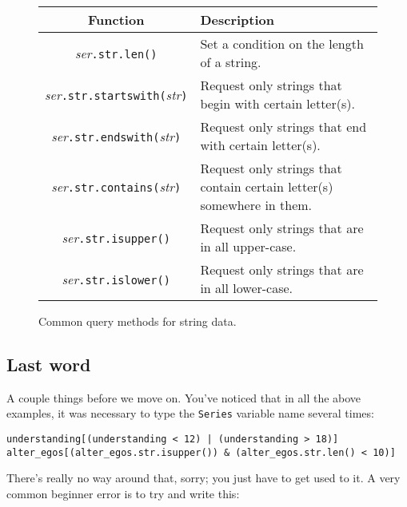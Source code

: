 \setlength\extrarowheight{5pt}

\begin{figure}[ht]
\centering
\begin{tabular}{c|p{3.3in}}
Function & Description \\
\hline

\textsl{ser}\texttt{.str.len()} & Set a condition on the length of a string. \\

\textsl{ser}\texttt{.str.startswith(}\textsl{str}\texttt{)} & Request only
strings that begin with certain letter(s). \\

\textsl{ser}\texttt{.str.endswith(}\textsl{str}\texttt{)} & Request only
strings that end with certain letter(s). \\

\textsl{ser}\texttt{.str.contains(}\textsl{str}\texttt{)} & Request only
strings that contain certain letter(s) somewhere in them. \\

\textsl{ser}\texttt{.str.isupper()} & Request only strings that are in all
upper-case. \\

\textsl{ser}\texttt{.str.islower()} & Request only strings that are in all
lower-case. \\

\end{tabular}
\bigskip
\caption{Common query methods for string data.}
\label{fig:stringQueryFunctions}
\end{figure}

\subsection{Last word}

A couple things before we move on. You've noticed that in all the above
examples, it was necessary to type the \texttt{Series} variable name several
times:

\begin{Verbatim}[fontsize=\small,samepage=true,frame=single,framesep=3mm]
understanding[(understanding < 12) | (understanding > 18)]
alter_egos[(alter_egos.str.isupper()) & (alter_egos.str.len() < 10)]
\end{Verbatim}

There's really no way around that, sorry; you just have to get used to it. A
very common beginner error is to try and write this:

